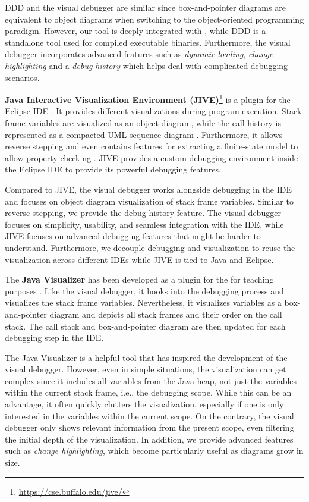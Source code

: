 \documentclass[sigconf]{acmart}
\begin{document}
DDD and the visual debugger are similar since box-and-pointer diagrams are equivalent to object diagrams when switching to the object-oriented programming paradigm.
However, our tool is deeply integrated with \intellij{}, while DDD is a standalone tool used for compiled executable binaries.
Furthermore, the visual debugger incorporates advanced features such as \textit{dynamic loading}, \textit{change highlighting} and a \textit{debug history} which helps deal with complicated debugging scenarios.

\textbf{Java Interactive Visualization Environment (JIVE)}\footnote{\url{https://cse.buffalo.edu/jive/}} is a plugin for the Eclipse IDE \cite{gestwickiJIVEJavaInteractive2004}.
It provides different visualizations during program execution.
Stack frame variables are visualized as an object diagram, while the call history is represented as a compacted UML sequence diagram \cite{jayaramanCompactVisualizationJava2017}.
Furthermore, it allows reverse stepping and even contains features for extracting a finite-state model to allow property checking \cite{k.p.FiniteStateModel2021}.
JIVE provides a custom debugging environment inside the Eclipse IDE to provide its powerful debugging features.

Compared to JIVE, the visual debugger works alongside debugging in the IDE and focuses on object diagram visualization of stack frame variables.
Similar to reverse stepping, we provide the debug history feature.
The visual debugger focuses on simplicity, usability, and seamless integration with the IDE, while JIVE focuses on advanced debugging features that might be harder to understand.
Furthermore, we decouple debugging and visualization to reuse the visualization across different IDEs while JIVE is tied to Java and Eclipse.

The \textbf{Java Visualizer} has been developed as a plugin for the \intellij{} for teaching purposes \cite{lipsitzJavaVisualizerIntelliJ2024}.
Like the visual debugger, it hooks into the debugging process and visualizes the stack frame variables.
Nevertheless, it visualizes variables as a box-and-pointer diagram and depicts all stack frames and their order on the call stack.
The call stack and box-and-pointer diagram are then updated for each debugging step in the IDE.

The Java Visualizer is a helpful tool that has inspired the development of the visual debugger.
However, even in simple situations, the visualization can get complex since it includes all variables from the Java heap, not just the variables within the current stack frame, i.e., the debugging scope.
While this can be an advantage, it often quickly clutters the visualization, especially if one is only interested in the variables within the current scope.
On the contrary, the visual debugger only shows relevant information from the present scope, even filtering the initial depth of the visualization.
In addition, we provide advanced features such as \textit{change highlighting}, which become particularly useful as diagrams grow in size.
\end{document}
